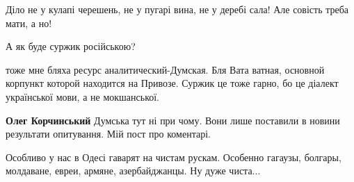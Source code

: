 Діло не у кулапі черешень, не у пугарі вина, не у деребі сала! Але совість
треба мати, а но!


 

А як буде суржик російською?

 

тоже мне бляха ресурс аналитический-Думская. Бля Вата ватная, основной корпункт
которой находится на Привозе. Суржик це тоже гарно, бо це діалект української
мови, а не мокшанської.

\begin{itemize}
 
\textbf{Олег Корчинський} Думська тут ні при чому. Вони лише поставили в новини результати опитування. Мій пост про коментарі.
\end{itemize}

 

Особливо у нас в Одесі гаварят на чистам рускам. Особенно гагаузы, болгары, молдаване, евреи, армяне, азербайджанцы.
Ну дуже чиста...

